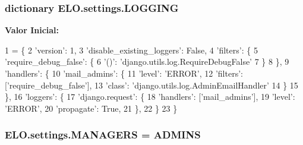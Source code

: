 \hypertarget{namespaceELO_1_1settings_addc421e02af1569796e2d33b2bc62ff5}{
\subsubsection[{L\-O\-G\-G\-I\-N\-G}]{\setlength{\rightskip}{0pt plus 5cm}dictionary E\-L\-O.\-settings.\-L\-O\-G\-G\-I\-N\-G}}\label{df/d5b/namespaceELO_1_1settings_addc421e02af1569796e2d33b2bc62ff5}
{\bfseries Valor Inicial\-:}
\begin{DoxyCode}
1 = \{
2     \textcolor{stringliteral}{'version'}: 1,
3     \textcolor{stringliteral}{'disable\_existing\_loggers'}: \textcolor{keyword}{False},
4     \textcolor{stringliteral}{'filters'}: \{
5         \textcolor{stringliteral}{'require\_debug\_false'}: \{
6             \textcolor{stringliteral}{'()'}: \textcolor{stringliteral}{'django.utils.log.RequireDebugFalse'}
7         \}
8     \},
9     \textcolor{stringliteral}{'handlers'}: \{
10         \textcolor{stringliteral}{'mail\_admins'}: \{
11             \textcolor{stringliteral}{'level'}: \textcolor{stringliteral}{'ERROR'},
12             \textcolor{stringliteral}{'filters'}: [\textcolor{stringliteral}{'require\_debug\_false'}],
13             \textcolor{stringliteral}{'class'}: \textcolor{stringliteral}{'django.utils.log.AdminEmailHandler'}
14         \}
15     \},
16     \textcolor{stringliteral}{'loggers'}: \{
17         \textcolor{stringliteral}{'django.request'}: \{
18             \textcolor{stringliteral}{'handlers'}: [\textcolor{stringliteral}{'mail\_admins'}],
19             \textcolor{stringliteral}{'level'}: \textcolor{stringliteral}{'ERROR'},
20             \textcolor{stringliteral}{'propagate'}: \textcolor{keyword}{True},
21         \},
22     \}
23 \}
\end{DoxyCode}
\hypertarget{namespaceELO_1_1settings_a43e8826e0b24e337065b4975f3eace4c}{
\subsubsection[{M\-A\-N\-A\-G\-E\-R\-S}]{\setlength{\rightskip}{0pt plus 5cm}E\-L\-O.\-settings.\-M\-A\-N\-A\-G\-E\-R\-S = {\bf A\-D\-M\-I\-N\-S}}}\label{df/d5b/namespaceELO_1_1settings_a43e8826e0b24e337065b4975f3eace4c}
